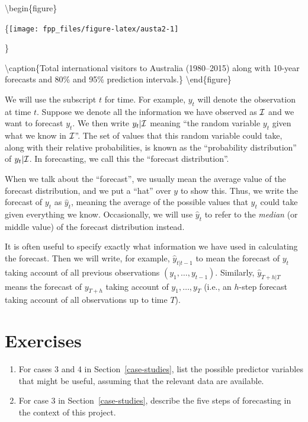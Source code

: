 \documentclass[]{book}
\begin{document}
\textbackslash{}begin\{figure\}

\{\centering \texttt{[image: fpp\_files/figure-latex/austa2-1]}

\}

\textbackslash{}caption\{Total international visitors to Australia (1980--2015) along with 10-year forecasts and 80\% and 95\% prediction intervals.\}\label{fig:austa2}
\textbackslash{}end\{figure\}

We will use the subscript \(t\) for time. For example, \(y_t\) will denote the observation at time \(t\). Suppose we denote all the information we have observed as \({\cal I}\) and we want to forecast \(y_t\). We then write \(y_{t} | {\cal I}\) meaning ``the random variable \(y_{t}\) given what we know in \({\cal I}\)''. The set of values that this random variable could take, along with their relative probabilities, is known as the ``probability distribution'' of \(y_{t} |{\cal I}\). In forecasting, we call this the ``forecast distribution''.

When we talk about the ``forecast'', we usually mean the average value of the forecast distribution, and we put a ``hat'' over \(y\) to show this. Thus, we write the forecast of \(y_t\) as \(\hat{y}_t\), meaning the average of the possible values that \(y_t\) could take given everything we know. Occasionally, we will use \(\hat{y}_t\) to refer to the \emph{median} (or middle value) of the forecast distribution instead.

It is often useful to specify exactly what information we have used in calculating the forecast. Then we will write, for example, \(\hat{y}_{t|t-1}\) to mean the forecast of \(y_t\) taking account of all previous observations \((y_1,\dots,y_{t-1})\). Similarly, \(\hat{y}_{T+h|T}\) means the forecast of \(y_{T+h}\) taking account of \(y_1,\dots,y_T\) (i.e., an \(h\)-step forecast taking account of all observations up to time \(T\)).

\hypertarget{exercises}{%
\section{Exercises}\label{exercises}}

\begin{enumerate}
\def\labelenumi{\arabic{enumi}.}
\item
  For cases 3 and 4 in Section~\ref{case-studies}, list the possible predictor variables that might be useful, assuming that the relevant data are available.
\item
  For case 3 in Section~\ref{case-studies}, describe the five steps of forecasting in the context of this project.
\end{enumerate}
\end{document}
